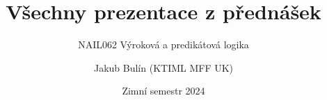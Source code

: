 \documentclass[handout]{beamer}
\title{Všechny prezentace z přednášek}
\subtitle{NAIL062 Výroková a predikátová logika}
\author{Jakub Bulín (KTIML MFF UK)}
\date{Zimní semestr 2024}
\begin{document}
\maketitle

\renewcommand{\maketitle}{}













\end{document}
